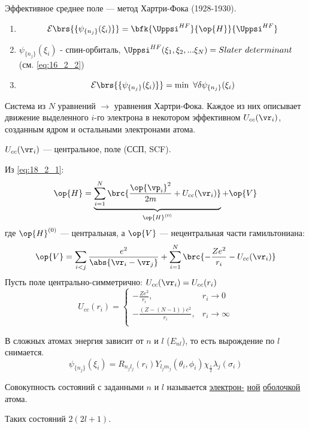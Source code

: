 Эффективное среднее поле --- метод Хартри-Фока (1928-1930).

\begin{enumerate}
\item \begin{equation}
\label{eq:18_2_2}
\mathcal{E}\brs{\{\psi_{\{n_j\}}(\xi_i)\}} = \bfk{\Uppsi^{HF}}{\op{H}}{\Uppsi^{HF}}
\end{equation}

\item $\psi_{\{n_j\}}(\xi_i)$ - спин-орбиталь,  $\Uppsi^{HF}(\xi_1, \xi_2, ... \xi_N) = Slater~determinant$ (см. \eqref{eq:16_2_2})

\item 
$$
\mathcal{E}\brs{\{\psi_{\{n_j\}}(\xi_i)\}} = \min~ \forall \delta\psi_{\{n_j\}}(\xi_i)
$$
\end{enumerate}

Система из $N$ уравнений $\to$ уравнения Хартри-Фока. Каждое из них описывает движение выделенного $i$-го электрона в некотором эффективном  $U_{cc}(\vr_i)$, созданным ядром и остальными электронами атома. 

$U_{cc}(\vr_i)$ --- центральное,  поле (ССП, SCF).

Из \eqref{eq:18_2_1}:
$$
\op{H} = \underbrace{\sum_{i=1}^{N} \brc{\frac{\op{\vp_i}^2}{2m} + U_{cc}(\vr_i)}}_{\op{H}^{(0)}} + \op{V}
$$
где $\op{H}^{(0)}$ --- центральная, а $\op{V}$ --- нецентральная части гамильтониана:
$$
\op{V} = \sum_{i<j} \frac{e^2}{\abs{\vr_i - \vr_j}} + \sum_{i=1}^N \brc{-\frac{Ze^2}{r_i} - U_{cc}(\vr_i)}
$$
Пусть поле центрально-симметрично: $U_{cc}(\vr_i) = U_{cc}(r_i)$
$$
U_{cc}(r_i) =
\begin{cases}
-\frac{Ze^2}{r_i},& r_i \to 0\\
-\frac{(Z-(N-1))e^2}{r_i},& r_i \to \infty\\
\end{cases}
$$

В сложных атомах энергия зависит от $n$ и $l$ ($E_{nl}$), то есть вырождение по $l$ снимается.
$$
\psi_{\{n_j\}}(\xi_i) = R_{n_j l_j}(r_i) Y_{l_j m_j}(\theta_i, \phi_i) \chi_{\frac{1}{2}} \lambda_j(\sigma_i)
$$


\begin{defn}
Совокупность состояний с заданными $n$ и $l$ называется \underline{электрон-} \underline{ной} \underline{оболочкой} атома.
\end{defn}

Таких состояний $2(2l + 1)$.

